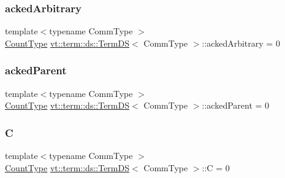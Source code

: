 \subsubsection{\texorpdfstring{acked\+Arbitrary}{ackedArbitrary}}
{\footnotesize\ttfamily template$<$typename Comm\+Type $>$ \\
\hyperlink{structvt_1_1term_1_1ds_1_1_term_d_s_a54f4ebd7e1ecb59c32c0f5b03ef9f20b}{Count\+Type} \hyperlink{structvt_1_1term_1_1ds_1_1_term_d_s}{vt\+::term\+::ds\+::\+Term\+DS}$<$ Comm\+Type $>$\+::acked\+Arbitrary = 0\hspace{0.3cm}{\ttfamily [protected]}}

\mbox{\label{structvt_1_1term_1_1ds_1_1_term_d_s_a694ea9720fa7137d823a58b55250119f}} 
\subsubsection{\texorpdfstring{acked\+Parent}{ackedParent}}
{\footnotesize\ttfamily template$<$typename Comm\+Type $>$ \\
\hyperlink{structvt_1_1term_1_1ds_1_1_term_d_s_a54f4ebd7e1ecb59c32c0f5b03ef9f20b}{Count\+Type} \hyperlink{structvt_1_1term_1_1ds_1_1_term_d_s}{vt\+::term\+::ds\+::\+Term\+DS}$<$ Comm\+Type $>$\+::acked\+Parent = 0\hspace{0.3cm}{\ttfamily [protected]}}

\mbox{\label{structvt_1_1term_1_1ds_1_1_term_d_s_a5d909caa14a0da42d9809d83e0f79f40}} 
\subsubsection{\texorpdfstring{C}{C}}
{\footnotesize\ttfamily template$<$typename Comm\+Type $>$ \\
\hyperlink{structvt_1_1term_1_1ds_1_1_term_d_s_a54f4ebd7e1ecb59c32c0f5b03ef9f20b}{Count\+Type} \hyperlink{structvt_1_1term_1_1ds_1_1_term_d_s}{vt\+::term\+::ds\+::\+Term\+DS}$<$ Comm\+Type $>$\+::C = 0\hspace{0.3cm}{\ttfamily [protected]}}

